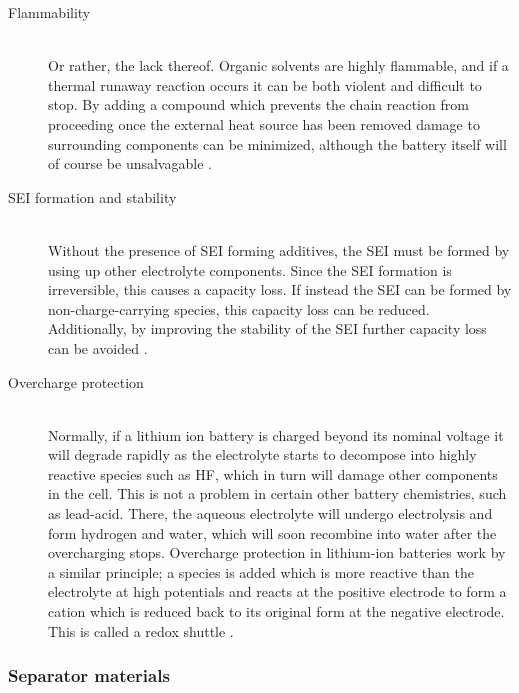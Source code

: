 \documentclass[12pt]{article} %
\begin{document}
\begin{description} %

\item[Flammability] \hfill \\
Or rather, the lack thereof.
Organic solvents are highly flammable, and if a thermal runaway reaction occurs it can be both violent and difficult to stop.
By adding a compound which prevents the chain reaction from proceeding once the external heat source has been removed damage to surrounding components can be minimized, although the battery itself will of course be unsalvagable \cite{blomgren_liquid_2003}.

\item[SEI formation and stability] \hfill \\
Without the presence of SEI forming additives, the SEI must be formed by using up other electrolyte components.
Since the SEI formation is irreversible, this causes a capacity loss.
If instead the SEI can be formed by non-charge-carrying species, this capacity loss can be reduced.
Additionally, by improving the stability of the SEI further capacity loss can be avoided \cite{reddy_thomas_section_2011-4}.

\item[Overcharge protection] \hfill \\
Normally, if a lithium ion battery is charged beyond its nominal voltage it will degrade rapidly as the electrolyte starts to decompose into highly reactive species such as HF, which in turn will damage other components in the cell.
This is not a problem in certain other battery chemistries, such as lead-acid.
There, the aqueous electrolyte will undergo electrolysis and form hydrogen and water, which will soon recombine into water after the overcharging stops.
Overcharge protection in lithium-ion batteries work by a similar principle; a species is added which is more reactive than the electrolyte at high potentials and reacts at the positive electrode to form a cation which is reduced back to its original form at the negative electrode.
This is called a redox shuttle \cite{blomgren_liquid_2003} \cite{reddy_thomas_section_2011-4}.

\end{description} 

\subsubsection{Separator materials} %
\end{document}
